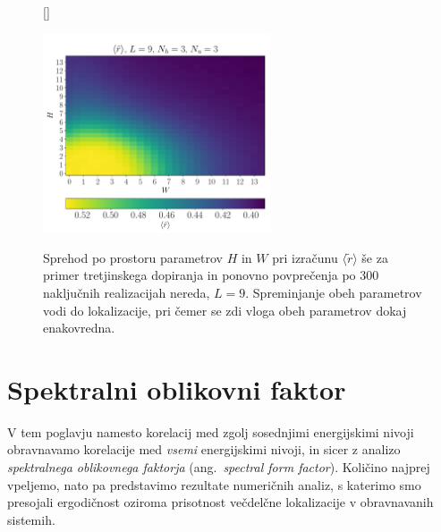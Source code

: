 \begin{figure}[H]
[\FBwidth]
{\caption{Sprehod po prostoru parametrov $H$ in $W$ pri izračunu $\langle \tilde{r}\rangle$ še za primer tretjinskega dopiranja in ponovno povprečenja po 300 naključnih realizacijah nereda, $L=9$. Spreminjanje obeh parametrov vodi do lokalizacije, pri čemer se zdi vloga obeh parametrov dokaj enakovredna. }\label{fig:r_density_9_3_3}}
{\includegraphics[width=0.6\textwidth]{r_density_9_3_3.pdf}}
\end{figure}
\newpage
 \section{Spektralni oblikovni faktor}
V tem poglavju namesto korelacij med zgolj sosednjimi energijskimi nivoji obravnavamo korelacije med \emph{vsemi} energijskimi nivoji, in sicer z analizo \emph{spektralnega oblikovnega faktorja} (ang.~\emph{spectral form factor}). Količino najprej vpeljemo, nato pa predstavimo rezultate numeričnih analiz, s katerimo smo presojali ergodičnost oziroma prisotnost večdelčne lokalizacije v obravnavanih sistemih. 
\label{spektralni_oblikovni_faktor}
